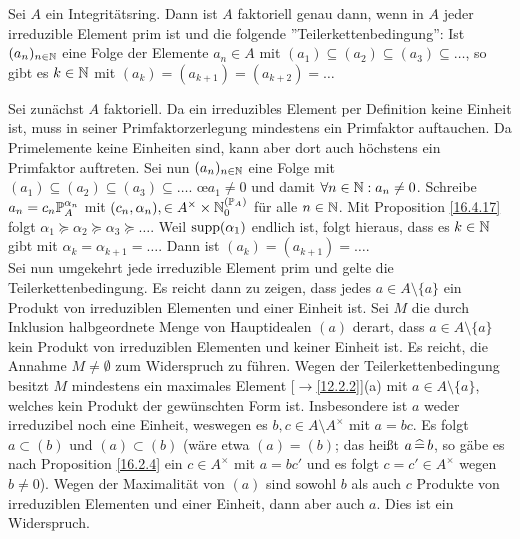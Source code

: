 \documentclass[../../main.tex]{subfiles}
\begin{document}
\begin{sat}\label{16.4.18}
Sei $A$ ein Integritätsring. Dann ist $A$ faktoriell genau dann, wenn in $A$ jeder irreduzible Element prim ist und die folgende ''Teilerkettenbedingung'': Ist $(a_n)_{n\in \N}$ eine Folge der Elemente $a_n\in A$ mit $(a_1)\subseteq (a_2)\subseteq(a_3)\subseteq\ldots $, so gibt es $k\in \N$ mit $(a_k)=(a_{k+1})=(a_{k+2})=\ldots $
\end{sat}
\begin{cproof}
Sei zunächst $A$ faktoriell. Da ein irreduzibles Element per Definition keine Einheit ist, muss in seiner Primfaktorzerlegung mindestens ein Primfaktor auftauchen. Da Primelemente keine Einheiten sind, kann aber dort auch höchstens ein Primfaktor auftreten. Sei nun $(a_n)_{n\in \N}$ eine Folge mit $(a_1)\subseteq (a_2)\subseteq(a_3)\subseteq\ldots $. \oe $a_1\neq 0$ und damit $\forall n\in \N: a_n\neq 0$. Schreibe $a_n=c_n\P_A^{\alpha_n}$ mit $(c_n,\alpha_n),\in A^\times\times \N_0^{(\P_A)}$ für alle $n\in \N$. Mit Proposition \ref{16.4.17} folgt $\alpha_1\succeq\alpha_2\succeq\alpha_3\succeq\ldots $. Weil $\supp(\alpha_1)$ endlich ist, folgt hieraus, dass es $k\in \N$ gibt mit $\alpha_k=\alpha_{k+1}=\ldots $. Dann ist $(a_k)=(a_{k+1})=\ldots $.\\

\noindent Sei nun umgekehrt jede irreduzible Element prim und gelte die Teilerkettenbedingung. Es reicht dann zu zeigen, dass jedes $a\in A\setminus\{a\}$ ein Produkt von irreduziblen Elementen und einer Einheit ist. Sei $M$ die durch Inklusion halbgeordnete Menge von Hauptidealen $(a)$ derart, dass $a\in A\setminus\{a\}$ kein Produkt von irreduziblen Elementen und keiner Einheit ist. Es reicht, die Annahme $M\neq \emptyset$ zum Widerspruch zu führen. Wegen der Teilerkettenbedingung besitzt $M$ mindestens ein maximales Element [$\to$\ref{12.2.2}](a) mit $a\in A\setminus\{a\}$, welches kein Produkt der gewünschten Form ist. Insbesondere ist $a$ weder irreduzibel noch eine Einheit, weswegen es $b,c\in A\setminus A^\times$ mit $a=bc$. Es folgt $a\subset(b)$ und $(a)\subset (b)$ (wäre etwa $(a)=(b)$; das heißt $a\divi b$, so gäbe es nach Proposition \ref{16.2.4} ein $c\in A^\times$ mit $a=bc'$ und es folgt $c=c'\in A^\times$ wegen $b\neq 0$). Wegen der Maximalität von $(a)$ sind sowohl $b$ als auch $c$ Produkte von irreduziblen Elementen und einer Einheit, dann aber auch $a$. Dies ist ein Widerspruch.
\end{cproof}
\end{document}
